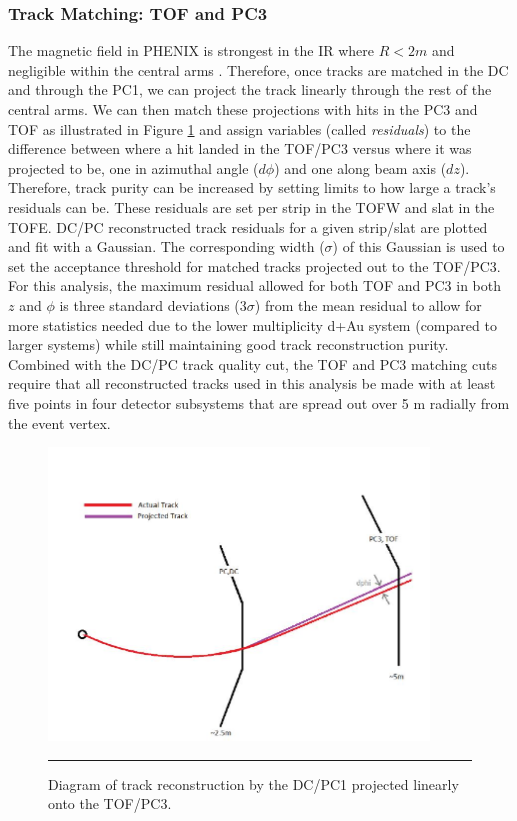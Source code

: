 \subsubsection{Track Matching: TOF and PC3}
The magnetic field in PHENIX is strongest in the IR where $R<2 m$ and negligible within the central arms \citep{rolnickthesis}. Therefore, once tracks are matched in the DC and through the PC1, we can project the track linearly through the rest of the central arms. We can then match these projections with hits in the PC3 and TOF as illustrated in Figure \ref{fig:pc3tofmatching} and assign variables (called \textit{residuals}) to the difference between where a hit landed in the TOF/PC3 versus where it was projected to be, one in azimuthal angle ($d\phi$) and one along beam axis ($dz$). Therefore, track purity can be increased by setting limits to how large a track's residuals can be. These residuals are set per strip in the TOFW and slat in the TOFE. DC/PC reconstructed track residuals for a given strip/slat are plotted and fit with a Gaussian. The corresponding width ($\sigma$) of this Gaussian is used to set the acceptance threshold for matched tracks projected out to the TOF/PC3. For this analysis, the maximum residual allowed for both TOF and PC3 in both $z$ and $\phi$ is three standard deviations ($3\sigma$) from the mean residual to allow for more statistics needed due to the lower multiplicity d+Au system (compared to larger systems) while still maintaining good track reconstruction purity. Combined with the DC/PC track quality cut, the TOF and PC3 matching cuts require that all reconstructed tracks used in this analysis be made with at least five points in four detector subsystems that are spread out over 5 m radially from the event vertex.
\begin{figure}[htbp!]
  \centering
    \includegraphics[width=0.9\textwidth]{Figures/pc3tofmatching.JPG}
    \rule{35em}{0.5pt}
  \caption[Diagram of track reconstruction by the DC/PC1 projected linearly onto the TOF/PC3]{Diagram of track reconstruction by the DC/PC1 projected linearly onto the TOF/PC3. \citep{schaeferthesis}}
  \label{fig:pc3tofmatching}
\end{figure}

